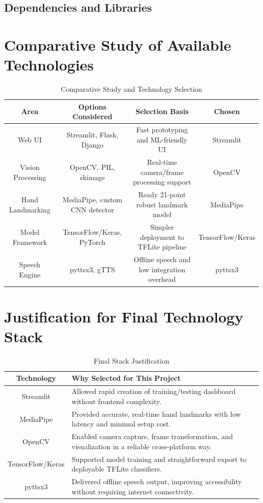 \subsection{Dependencies and Libraries}

\section{Comparative Study of Available Technologies}

\begin{table}[H]
\centering
\begin{tabular}{|c|c|c|c|}
\hline
\textbf{Area} & \textbf{Options Considered} & \textbf{Selection Basis} & \textbf{Chosen} \\
\hline
Web UI & Streamlit, Flask, Django & Fast prototyping and ML-friendly UI & Streamlit \\
\hline
Vision Processing & OpenCV, PIL, skimage & Real-time camera/frame processing support & OpenCV \\
\hline
Hand Landmarking & MediaPipe, custom CNN detector & Ready 21-point robust landmark model & MediaPipe \\
\hline
Model Framework & TensorFlow/Keras, PyTorch & Simpler deployment to TFLite pipeline & TensorFlow/Keras \\
\hline
Speech Engine & pyttsx3, gTTS & Offline speech and low integration overhead & pyttsx3 \\
\hline
\end{tabular}
\caption{Comparative Study and Technology Selection}
\end{table}

\section{Justification for Final Technology Stack}

\begin{table}[H]
\centering
\begin{tabular}{|c|p{}|}
\hline
\textbf{Technology} & \textbf{Why Selected for This Project} \\
\hline
Streamlit & Allowed rapid creation of training/testing dashboard without frontend complexity. \\
\hline
MediaPipe & Provided accurate, real-time hand landmarks with low latency and minimal setup cost. \\
\hline
OpenCV & Enabled camera capture, frame transformation, and visualization in a reliable cross-platform way. \\
\hline
TensorFlow/Keras & Supported model training and straightforward export to deployable TFLite classifiers. \\
\hline
pyttsx3 & Delivered offline speech output, improving accessibility without requiring internet connectivity. \\
\hline
\end{tabular}
\caption{Final Stack Justification}
\end{table}

